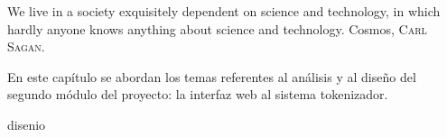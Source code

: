%
%

{
  \epigrafe
  {%
    We live in a society exquisitely dependent on science and technology, in
    which hardly anyone knows anything about science and technology.%
  }
  {%
    Cosmos,
    \textsc{Carl Sagan}.%
  }
}

\noindent
En este capítulo se abordan los temas referentes al análisis y al diseño del
segundo módulo del proyecto: la interfaz web al sistema tokenizador.

{disenio}
